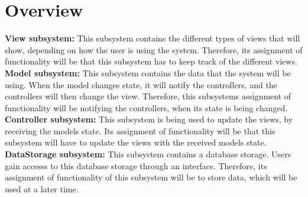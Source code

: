 \section{Overview}

\textbf{View subsystem:}
This subsystem contains the different types of views that will show, depending on how the user is 
using the system. Therefore, its assignment of functionality will be that this subsystem 
has to keep track of the different views.\\

\textbf{Model subsystem:}
This subsystem contains the data that the system will be using. When the model changes state, 
it will notify the controllers, and the controllers will then change the view. Therefore, 
this subsystems assignment of functionality will be notifying the controllers, 
when its state is being changed.\\

\textbf{Controller subsystem:}
This subsystem is being used to update the views, by receiving the models state. 
Its assignment of functionality will be that this subsystem will have to update the views 
with the received models state.\\

\textbf{DataStorage subsystem:}
This subsystem contains a database storage. Users gain accesss to this database storage through an interface.
Therefore, its assignment of functionality of this subsystem will be to store data, which will be used at a later time.
